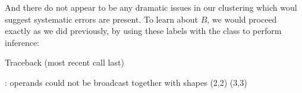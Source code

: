 \documentclass[letterpaper,10pt,english]{jupyterBook}
\begin{document}
\sphinxAtStartPar
And there do not appear to be any dramatic issues in our clustering which woul suggest systematic errors are present. To learn about \(B\), we would proceed exactly as we did previously, by using these labels with the  class to perform inference:

\begin{sphinxVerbatim}[commandchars=\\\{\}]
   
 
  
\end{sphinxVerbatim}

\begin{sphinxVerbatim}[commandchars=\\\{\}]
Traceback (most recent call last)
  
         \PYG{p}{[}\PYG{p}{]}
   
         
         

: operands could not be broadcast together with shapes (2,2) (3,3) 
\end{sphinxVerbatim}
\end{document}
